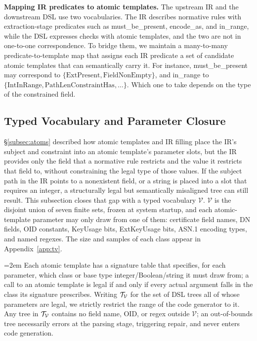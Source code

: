 \textbf{Mapping IR predicates to atomic templates.} The upstream
IR and the downstream DSL use two vocabularies. The IR describes normative rules
with extraction-stage predicates such as must\_be\_present,
encode\_as, and in\_range, while the DSL expresses checks with
atomic templates, and the two are not in one-to-one correspondence. To
bridge them, we maintain a many-to-many predicate-to-template map that assigns each IR
predicate a set of candidate atomic templates that can semantically carry it.
For instance, must\_be\_present may correspond to $\{\mathrm{ExtPresent},
\mathrm{FieldNonEmpty}\}$, and in\_range to $\{\mathrm{IntInRange},
\mathrm{PathLenConstraintHas}, \dots\}$. Which one to take depends on the type
of the constrained field.

\subsection{Typed Vocabulary and Parameter Closure}
\label{subsec:tv}

\S\ref{subsec:atoms} described how atomic templates and IR filling place the
IR's subject and constraint into an atomic template's parameter slots, but the
IR provides only the field that a normative rule restricts and the value it
restricts that field to,
without constraining the legal type of those values. If the subject path
in the IR points to a nonexistent field, or a string is placed into a slot that
requires an integer, a structurally legal but semantically misaligned tree can
still result. This subsection closes that gap with a typed vocabulary
$\mathcal{V}$. $\mathcal{V}$ is the disjoint union of seven finite sets, frozen
at system startup, and each atomic-template parameter may only draw from one of
them: certificate field names, DN fields, OID constants, KeyUsage bits,
ExtKeyUsage bits, ASN.1 encoding types, and named regexes. The size and samples
of each class appear in Appendix~\ref{app:tv}.

\begingroup\emergencystretch=2em\relax
Each atomic template has a signature table that specifies, for each parameter,
which class or base type integer/Boolean/string it must draw from; a call to an
atomic template is legal if and only if every actual argument falls in the class its
signature prescribes. Writing $\mathcal{T}_{\mathcal{V}}$ for the set of DSL trees all of whose
parameters are legal, we strictly restrict the range of the code generator to
it. Any tree in $\mathcal{T}_{\mathcal{V}}$ contains no field name, OID, or regex
outside $\mathcal{V}$; an out-of-bounds tree necessarily errors at the parsing
stage, triggering repair, and never enters code generation.
\par\endgroup


